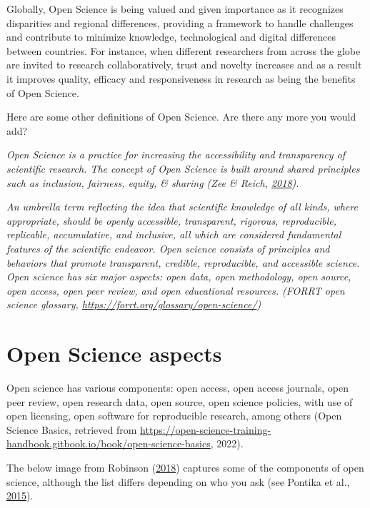 \documentclass[
  letterpaper,
  DIV=11,
  numbers=noendperiod]{scrreport}
\begin{document}
Globally, Open Science is being valued and given importance as it
recognizes disparities and regional differences, providing a framework
to handle challenges and contribute to minimize knowledge, technological
and digital differences between countries. For instance, when different
researchers from across the globe are invited to research
collaboratively, trust and novelty increases and as a result it improves
quality, efficacy and responsiveness in research as being the benefits
of Open Science.

Here are some other definitions of Open Science. Are there any more you
would add?

\emph{Open Science is a practice for increasing the accessibility and
transparency of scientific research. The concept of Open Science is
built around shared principles such as inclusion, fairness, equity, \&
sharing (Zee \& Reich,
\href{https://doi.org/10.1177/2332858418787466}{2018}).}

\emph{An umbrella term reflecting the idea that scientific knowledge of
all kinds, where appropriate, should be openly accessible, transparent,
rigorous, reproducible, replicable, accumulative, and inclusive, all
which are considered fundamental features of the scientific endeavor.
Open science consists of principles and behaviors that promote
transparent, credible, reproducible, and accessible science. Open
science has six major aspects: open data, open methodology, open source,
open access, open peer review, and open educational resources. (FORRT
open science glossary, \url{https://forrt.org/glossary/open-science/})}

\hypertarget{open-science-aspects}{%
\section*{Open Science aspects}\label{open-science-aspects}}


Open science has various components: open access, open access journals,
open peer review, open research data, open source, open science
policies, with use of open licensing, open software for reproducible
research, among others (Open Science Basics, retrieved from
\url{https://open-science-training-handbook.gitbook.io/book/open-science-basics},
2022).

The below image from Robinson
(\href{https://osaos.codeforscience.org/what-is-open/}{2018}) captures
some of the components of open science, although the list differs
depending on who you ask (see Pontika et al.,
\href{http://dx.doi.org/doi:10.1145/2809563.2809571}{2015}).
\end{document}
